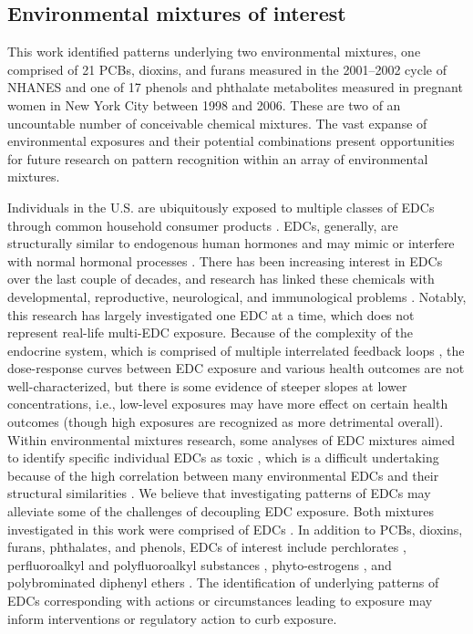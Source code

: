 \subsection{Environmental mixtures of interest}
This work identified patterns underlying two environmental mixtures, one comprised of 21 PCBs, dioxins, and furans measured in the 2001--2002 cycle of NHANES and one of 17 phenols and phthalate metabolites measured in pregnant women in New York City between 1998 and 2006. These are two of an uncountable number of conceivable chemical mixtures. The vast expanse of environmental exposures and their potential combinations present opportunities for future research on pattern recognition within an array of environmental mixtures. 

Individuals in the U.S. are ubiquitously exposed to multiple classes of EDCs through common household consumer products \citep{gore2015edc}. EDCs, generally, are structurally similar to endogenous human hormones and may mimic or interfere with normal hormonal processes \citep{kavlock1996research, zoeller2012endocrine}. There has been increasing interest in EDCs over the last couple of decades, and research has linked these chemicals with developmental, reproductive, neurological, and immunological problems \citep{solomon2000environment, meeker2012exposure, kabir2015review}. Notably, this research has largely investigated one EDC at a time, which does not represent real-life multi-EDC exposure. Because of the complexity of the endocrine system, which is comprised of multiple interrelated feedback loops \citep{diamanti2009endocrine}, the dose-response curves between EDC exposure and various health outcomes are not well-characterized, but there is some evidence of steeper slopes at lower concentrations, i.e., low-level exposures may have more effect on certain health outcomes (though high exposures are recognized as more detrimental overall). Within environmental mixtures research, some analyses of EDC mixtures aimed to identify specific individual EDCs as toxic \citep{tanner2020early, loftus2021exposure}, which is a difficult undertaking because of the high correlation between many environmental EDCs and their structural similarities \citep{kavlock1996research, zoeller2012endocrine}. We believe that investigating patterns of EDCs may alleviate some of the challenges of decoupling EDC exposure. Both mixtures investigated in this work were comprised of EDCs \citep{gore2015edc, van1998toxic}. In addition to PCBs, dioxins, furans, phthalates, and phenols, EDCs of interest include perchlorates \citep{nizinski2020perchlorate}, perfluoroalkyl and polyfluoroalkyl substances \citep{pfaswebsite}, phyto-estrogens \citep{yilmaz2020endocrine}, and polybrominated diphenyl ethers \citep{gibson2018effects}. The identification of underlying patterns of EDCs corresponding with actions or circumstances leading to exposure may inform interventions or regulatory action to curb exposure.

